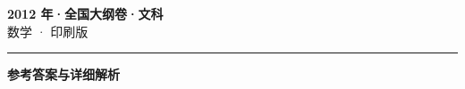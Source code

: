 \documentclass[zihao=5, a4paper]{ctexart}
\begin{document}
\begin{center}
  {\Large\bfseries 2012 年·全国大纲卷·文科}\\[4pt]
  {\large 数学 · 印刷版}
\end{center}
\medskip
{}

\par\bigskip\hrule\bigskip
{}
\begin{center}{\large\bfseries 参考答案与详细解析}\end{center}
\smallskip

\end{document}
